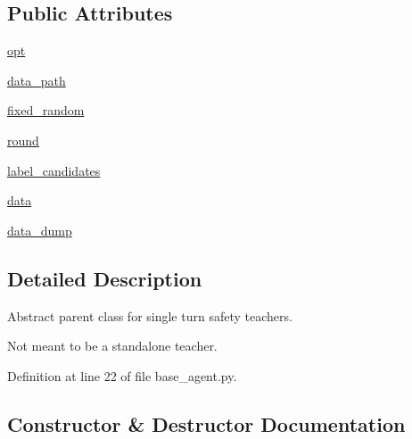 \subsection*{Public Attributes}
\begin{DoxyCompactItemize}
\item 
\hyperlink{classparlai_1_1tasks_1_1dialogue__safety_1_1base__agent_1_1__BaseSafetyTeacher_a72d5420bf860ece2469f704aff6a4741}{opt}
\item 
\hyperlink{classparlai_1_1tasks_1_1dialogue__safety_1_1base__agent_1_1__BaseSafetyTeacher_acc01c5943e88188386156bee04df64cd}{data\+\_\+path}
\item 
\hyperlink{classparlai_1_1tasks_1_1dialogue__safety_1_1base__agent_1_1__BaseSafetyTeacher_ac288768013bb6f6eae5b6d54e6038c97}{fixed\+\_\+random}
\item 
\hyperlink{classparlai_1_1tasks_1_1dialogue__safety_1_1base__agent_1_1__BaseSafetyTeacher_a3de49870b976f3f356d43d18bdee3206}{round}
\item 
\hyperlink{classparlai_1_1tasks_1_1dialogue__safety_1_1base__agent_1_1__BaseSafetyTeacher_a5f12c3a58104bcbe47d921c5fc74f571}{label\+\_\+candidates}
\item 
\hyperlink{classparlai_1_1tasks_1_1dialogue__safety_1_1base__agent_1_1__BaseSafetyTeacher_aa6fcadfe3658452b2ec1d1ab7fba050e}{data}
\item 
\hyperlink{classparlai_1_1tasks_1_1dialogue__safety_1_1base__agent_1_1__BaseSafetyTeacher_aa689aab73ec3cfd0047bb8ec694893b3}{data\+\_\+dump}
\end{DoxyCompactItemize}


\subsection{Detailed Description}
\begin{DoxyVerb}Abstract parent class for single turn safety teachers.

Not meant to be a standalone teacher.
\end{DoxyVerb}
 

Definition at line 22 of file base\+\_\+agent.\+py.



\subsection{Constructor \& Destructor Documentation}
\mbox{\label{classparlai_1_1tasks_1_1dialogue__safety_1_1base__agent_1_1__BaseSafetyTeacher_a30315340193b3ddc6edde594193b3325}} 
